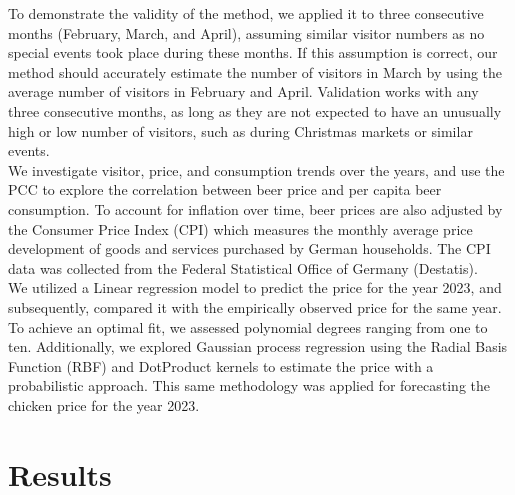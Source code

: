 \documentclass{article}
\theoremstyle{plain}
\theoremstyle{definition}
\theoremstyle{remark}
\begin{document}
To demonstrate the validity of the method, we applied it to three consecutive months (February, March, and April), assuming similar visitor numbers as no special events took place during these months. If this assumption is correct, our method should accurately estimate the number of visitors in March by using the average number of visitors in February and April. Validation works with any three consecutive months, as long as they are not expected to have an unusually high or low number of visitors, such as during Christmas markets or similar events.\\
We investigate visitor, price, and consumption trends over the years, and use the PCC to explore the correlation between beer price and per capita beer consumption. To account for inflation over time, beer prices are also adjusted by the Consumer Price Index (CPI) which measures the monthly average price development of goods and services purchased by German households. The CPI data was collected from the Federal Statistical Office of Germany (Destatis).\\
We utilized a Linear regression model to predict the price for the year 2023, and subsequently, compared it with the empirically observed price for the same year. To achieve an optimal fit, we assessed polynomial degrees ranging from one to ten. Additionally, we explored Gaussian process regression using the Radial Basis Function (RBF) and DotProduct kernels to estimate the price with a probabilistic approach. This same methodology was applied for forecasting the chicken price for the year 2023.

% 

\section{Results}\label{sec:results}
\end{document}
